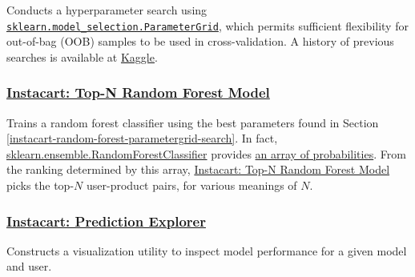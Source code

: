 \documentclass[11pt]{article}
\theoremstyle{definition}
\numberwithin{equation}{section}
\begin{document}
Conducts a hyperparameter search using
\href{https://scikit-learn.org/stable/modules/generated/sklearn.model_selection.ParameterGrid.html}{\texttt{sklearn.model\_selection.ParameterGrid}},
which permits sufficient flexibility for out-of-bag (OOB) samples to be
used in cross-validation. A history of previous searches is available at
\href{https://www.kaggle.com/eangel/instacart-random-forest-parametergrid-search}{Kaggle}.

\hypertarget{instacart-top-n-random-forest-model}{%
  \subsubsection{\texorpdfstring{\href{./instacart-top-n-random-forest-model.ipynb}{Instacart:
        Top-N Random Forest
        Model}}{Instacart: Top-N Random Forest Model}}\label{instacart-top-n-random-forest-model}}

Trains a random forest classifier using the best parameters found in
Section \ref{instacart-random-forest-parametergrid-search}. In fact,
\href{https://scikit-learn.org/stable/modules/generated/sklearn.ensemble.RandomForestClassifier.html}{sklearn.ensemble.RandomForestClassifier}
provides
\href{https://scikit-learn.org/stable/modules/generated/sklearn.ensemble.RandomForestClassifier.html\#sklearn.ensemble.RandomForestClassifier.predict_proba}{an
  array of probabilities}. From the ranking determined by this array,
\href{./instacart-top-n-random-forest-model.ipynb}{Instacart: Top-N Random
  Forest Model} picks the top-\(N\) user-product pairs, for various
meanings of \(N\).

\hypertarget{instacart-prediction-explorer}{%
  \subsubsection{\texorpdfstring{\href{./instacart-inspect-predictions.ipynb}{Instacart:
        Prediction
        Explorer}}{Instacart: Prediction Explorer}}\label{instacart-prediction-explorer}}

Constructs a visualization utility to inspect model performance for a
given model and user.



{}
\end{document}
